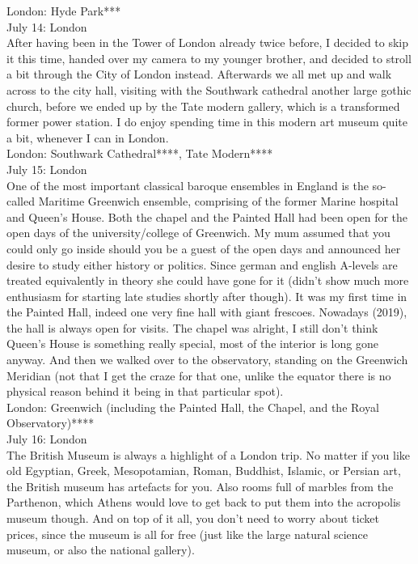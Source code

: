 London: Hyde Park***\\

July 14: London\\
After having been in the Tower of London already twice before, I decided to skip it this time, handed over my camera to my younger brother, and decided to stroll a bit through the City of London instead. Afterwards we all met up and walk across to the city hall, visiting with the Southwark cathedral another large gothic church, before we ended up by the Tate modern gallery, which is a transformed former power station. I do enjoy spending time in this modern art museum quite a bit, whenever I can in London.\\

London: Southwark Cathedral****,  Tate Modern****\\

July 15: London\\
One of the most important classical baroque ensembles in England is the so-called Maritime Greenwich ensemble, comprising of the former Marine hospital and Queen's House. Both the chapel and the Painted Hall had been open for the open days of the university/college of Greenwich. My mum assumed that you could only go inside should you be a guest of the open days and announced her desire to study either history or politics. Since german and english A-levels are treated equivalently in theory she could have gone for it (didn't show much more enthusiasm for starting late studies shortly after though). It was my first time in the Painted Hall, indeed one very fine hall with giant frescoes. Nowadays (2019), the hall is always open for visits. The chapel was alright, I still don't think Queen's House is something really special, most of the interior is long gone anyway. And then we walked over to the observatory, standing on the Greenwich Meridian (not that I get the craze for that one, unlike the equator there is no physical reason behind it being in that particular spot).\\

London: Greenwich (including the Painted Hall, the Chapel, and the Royal Observatory)****\\

July 16: London\\
The British Museum is always a highlight of a London trip. No matter if you like old Egyptian, Greek, Mesopotamian, Roman, Buddhist, Islamic, or Persian art, the British museum has artefacts for you. Also rooms full of marbles from the Parthenon, which Athens would love to get back to put them into the acropolis museum though. And on top of it all, you don't need to worry about ticket prices, since the museum is all for free (just like the large natural science museum, or also the national gallery).\\

